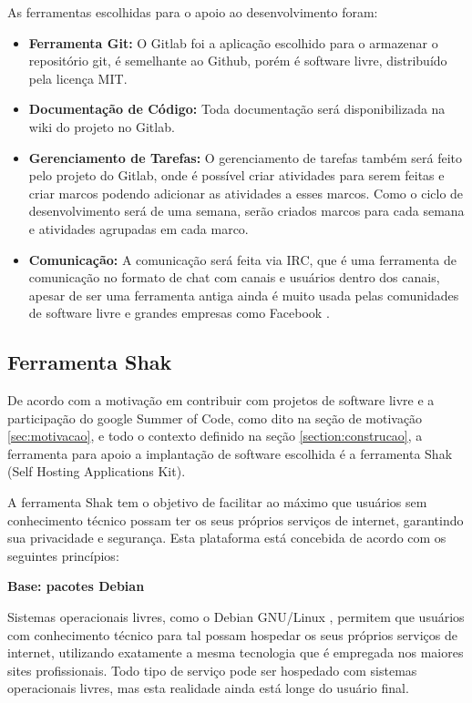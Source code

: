As ferramentas escolhidas para o apoio ao desenvolvimento foram:
\begin{itemize}
  \item \textbf{Ferramenta Git:} O Gitlab foi a aplicação escolhido para o armazenar o
  repositório git, é semelhante ao Github, porém é software livre, distribuído pela
  licença MIT\cite{gitlab}.
  \item \textbf{Documentação de Código:} Toda documentação será disponibilizada
  na wiki do projeto no Gitlab.
  \item \textbf{Gerenciamento de Tarefas:} O gerenciamento de tarefas também será
  feito pelo projeto do Gitlab, onde é possível criar atividades para serem feitas
  e criar marcos podendo adicionar as atividades a esses marcos. Como o ciclo de
  desenvolvimento será de uma semana, serão criados marcos para cada semana e atividades
  agrupadas em cada marco.
  \item \textbf{Comunicação:} A comunicação será feita via IRC, que é uma ferramenta
  de comunicação no formato de chat com canais e usuários dentro dos canais,
  apesar de ser uma ferramenta antiga ainda é muito usada pelas comunidades de software
  livre e grandes empresas como Facebook \cite{artigofacebook}.
\end{itemize}

\subsection{Ferramenta Shak}

De acordo com a motivação em contribuir com projetos de software livre
e a participação do google Summer of Code, como dito na seção de motivação
\ref{sec:motivacao}, e todo o contexto definido na seção \ref{section:construcao},
a ferramenta para apoio a implantação de software escolhida
é a ferramenta Shak (Self Hosting Applications Kit).

A ferramenta Shak tem o objetivo de facilitar ao máximo que usuários sem conhecimento
técnico possam ter os seus próprios serviços de internet, garantindo sua privacidade
e segurança. Esta plataforma está concebida de acordo com os seguintes princípios:

\textbf{Base: pacotes Debian}

Sistemas operacionais livres, como o Debian
GNU/Linux , permitem que usuários com conhecimento
técnico para tal possam hospedar os seus próprios serviços de internet,
utilizando exatamente a mesma tecnologia que é empregada nos maiores sites
profissionais. Todo tipo de serviço pode ser hospedado com sistemas
operacionais livres, mas esta realidade ainda está longe do usuário final.

